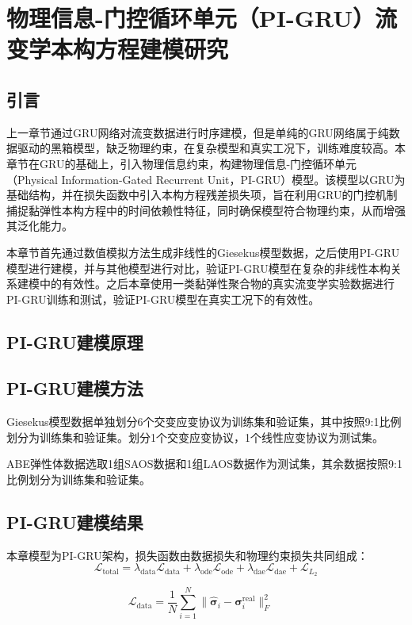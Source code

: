 \chapter{物理信息-门控循环单元（PI-GRU）流变学本构方程建模研究}

\section{引言}
上一章节通过GRU网络对流变数据进行时序建模，但是单纯的GRU网络属于纯数据驱动的黑箱模型，缺乏物理约束，在复杂模型和真实工况下，训练难度较高。本章节在GRU的基础上，引入物理信息约束，构建物理信息-门控循环单元（Physical Information-Gated Recurrent Unit，PI-GRU）模型。该模型以GRU为基础结构，并在损失函数中引入本构方程残差损失项，旨在利用GRU的门控机制捕捉黏弹性本构方程中的时间依赖性特征，同时确保模型符合物理约束，从而增强其泛化能力。

本章节首先通过数值模拟方法生成非线性的Giesekus模型数据，之后使用PI-GRU模型进行建模，并与其他模型进行对比，验证PI-GRU模型在复杂的非线性本构关系建模中的有效性。之后本章使用一类黏弹性聚合物的真实流变学实验数据进行PI-GRU训练和测试，验证PI-GRU模型在真实工况下的有效性。

\section{PI-GRU建模原理}

\section{PI-GRU建模方法}
Giesekus模型数据单独划分6个交变应变协议为训练集和验证集，其中按照9:1比例划分为训练集和验证集。划分1个交变应变协议，1个线性应变协议为测试集。

ABE弹性体数据选取1组SAOS数据和1组LAOS数据作为测试集，其余数据按照9:1比例划分为训练集和验证集。
\section{PI-GRU建模结果}
本章模型为PI-GRU架构，损失函数由数据损失和物理约束损失共同组成：
\begin{equation}
  \mathcal{L}_{\text{total}} =
  \lambda_{\text{data}} \mathcal{L}_{\text{data}} +
  \lambda_{\text{ode}} \mathcal{L}_{\text{ode}} +
  \lambda_{\text{dae}} \mathcal{L}_{\text{dae}}+
  \mathcal{L}_{L_{2}}
\end{equation}

\begin{equation}
  \mathcal{L}_{\text{data}} = \frac{1}{N} \sum_{i=1}^N
  \|\hat{\bm{\sigma}}_i - \bm{\sigma}_i^{\text{real}}\|_F^2
  \quad
\end{equation}

